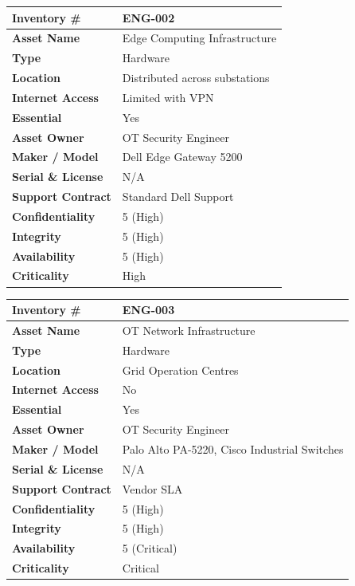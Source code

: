\begin{longtable}{|p{4cm}|p{9cm}|}
\hline
\textbf{Inventory \#} & ENG-002 \\\hline
\textbf{Asset Name} & Edge Computing Infrastructure \\\hline
\textbf{Type} & Hardware \\\hline
\textbf{Location} & Distributed across substations \\\hline
\textbf{Internet Access} & Limited with \ac{VPN}  \\\hline
\textbf{Essential} & Yes \\\hline
\textbf{Asset Owner} & \ac{OT} Security Engineer \\\hline
\textbf{Maker / Model} & Dell Edge Gateway 5200 \\\hline
\textbf{Serial \& License} & N/A \\\hline
\textbf{Support Contract} & Standard Dell Support \\\hline
\textbf{Confidentiality} & 5 (High) \\\hline
\textbf{Integrity} & 5 (High) \\\hline
\textbf{Availability} & 5 (High) \\\hline
\textbf{Criticality} & High \\\hline
\end{longtable}

\begin{longtable}{|p{4cm}|p{9cm}|}
\hline
\textbf{Inventory \#} & ENG-003 \\\hline
\textbf{Asset Name} & \ac{OT} Network Infrastructure \\\hline
\textbf{Type} & Hardware \\\hline
\textbf{Location} & Grid Operation Centres \\\hline
\textbf{Internet Access} & No \\\hline
\textbf{Essential} & Yes \\\hline
\textbf{Asset Owner} & \ac{OT} Security Engineer \\\hline
\textbf{Maker / Model} & Palo Alto PA-5220, Cisco Industrial Switches \\\hline
\textbf{Serial \& License} & N/A \\\hline
\textbf{Support Contract} & Vendor \ac{SLA} \\\hline
\textbf{Confidentiality} & 5 (High) \\\hline
\textbf{Integrity} & 5 (High) \\\hline
\textbf{Availability} & 5 (Critical) \\\hline
\textbf{Criticality} & Critical \\\hline
\end{longtable}


